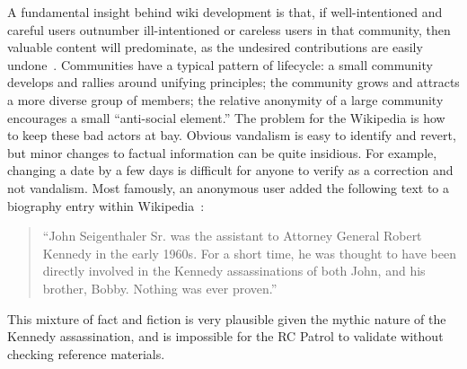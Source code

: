 A fundamental insight behind wiki development is that,
if well-intentioned and careful users outnumber ill-intentioned
or careless users in that community, then valuable content will predominate,
as the undesired contributions are easily undone~\cite{Wikis01}.
Communities have a typical pattern of lifecycle:
a small community develops and rallies around unifying principles;
the community grows and attracts a more diverse group of members;
the relative anonymity of a large community encourages
a small ``anti-social element.''
The problem for the Wikipedia is how to keep these bad actors at bay.
Obvious vandalism is easy to identify and revert,
but minor changes to factual information can be quite insidious.
For example, changing a date by a few days is difficult for anyone
to verify as a correction and not vandalism.
Most famously, an anonymous user added the following text to a biography entry
within Wikipedia~\cite{Seigenthaler05,NewYorkTimes05a,NewYorkTimes05b}:
\begin{quote}
``John Seigenthaler Sr. was the assistant to
Attorney General Robert Kennedy in the early 1960s.
For a short time, he was thought to have been directly involved
in the Kennedy assassinations of both John, and his brother, Bobby.
Nothing was ever proven.''
\end{quote}
This mixture of fact and fiction is very plausible given the
mythic nature of the Kennedy assassination, and is impossible
for the RC Patrol to validate without checking reference materials.

